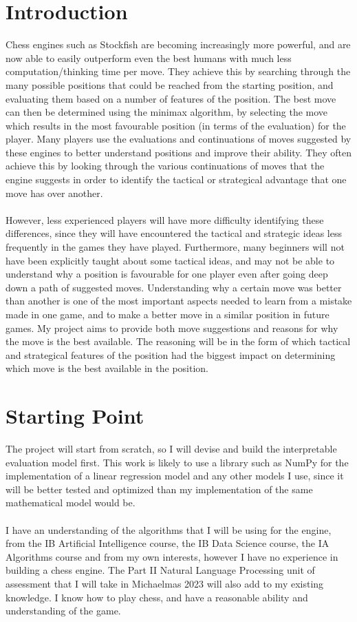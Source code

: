 \documentclass[12pt,a4paper]{article}
\begin{document}
\section*{Introduction}
Chess engines such as Stockfish are becoming increasingly more powerful, and are now able to easily outperform even the best humans with much less computation/thinking time per move. They achieve this by searching through the many possible positions that could be reached from the starting position, and evaluating them based on a number of features of the position. The best move can then be determined using the minimax algorithm, by selecting the move which results in the most favourable position (in terms of the evaluation) for the player. Many players use the evaluations and continuations of moves suggested by these engines to better understand positions and improve their ability. They often achieve this by looking through the various continuations of moves that the engine suggests in order to identify the tactical or strategical advantage that one move has over another.
\\\\
However, less experienced players will have more difficulty identifying these differences, since they will have encountered the tactical and strategic ideas less frequently in the games they have played. Furthermore, many beginners will not have been explicitly taught about some tactical ideas, and may not be able to understand why a position is favourable for one player even after going deep down a path of suggested moves. Understanding why a certain move was better than another is one of the most important aspects needed to learn from a mistake made in one game, and to make a better move in a similar position in future games. My project aims to provide both move suggestions and reasons for why the move is the best available. The reasoning will be in the form of which tactical and strategical features of the position had the biggest impact on determining which move is the best available in the position.

\section*{Starting Point}
The project will start from scratch, so I will devise and build the interpretable evaluation model first. This work is likely to use a library such as NumPy for the implementation of a linear regression model and any other models I use, since it will be better tested and optimized than my implementation of the same mathematical model would be.
\\\\
I have an understanding of the algorithms that I will be using for the engine, from the IB Artificial Intelligence course, the IB Data Science course, the IA Algorithms course and from my own interests, however I have no experience in building a chess engine. The Part II Natural Language Processing unit of assessment that I will take in Michaelmas 2023 will also add to my existing knowledge. I know how to play chess, and have a reasonable ability and understanding of the game.
\end{document}
